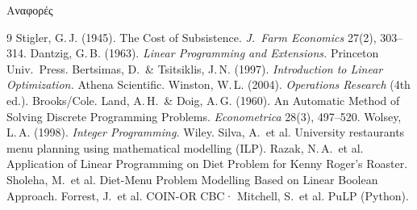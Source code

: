 \documentclass[aspectratio=169,11pt]{beamer}
\newcommand{\en}[1]{\textenglish{#1}}
\begin{document}
\appendix
\begin{frame}[allowframebreaks]{Αναφορές}
  \footnotesize
  \begin{thebibliography}{9}
     \en{Stigler, G.\,J. (1945). The Cost of Subsistence.
      \textit{J.\ Farm Economics} 27(2), 303--314.}
     \en{Dantzig, G.\,B. (1963). \textit{Linear Programming and
      Extensions.} Princeton Univ.\ Press.}
     \en{Bertsimas, D.\ \& Tsitsiklis, J.\,N. (1997).
      \textit{Introduction to Linear Optimization.} Athena Scientific.}
     \en{Winston, W.\,L. (2004). \textit{Operations Research}
      (4th ed.). Brooks/Cole.}
     \en{Land, A.\,H.\ \& Doig, A.\,G. (1960). An Automatic Method
      of Solving Discrete Programming Problems. \textit{Econometrica} 28(3), 497--520.}
     \en{Wolsey, L.\,A. (1998). \textit{Integer Programming.} Wiley.}
     \en{Silva, A.\ et al. University restaurants menu planning using
      mathematical modelling (ILP).}
     \en{Razak, N.\,A.\ et al. Application of Linear Programming on
      Diet Problem for Kenny Roger's Roaster.}
     \en{Sholeha, M.\ et al. Diet-Menu Problem Modelling Based on
      Linear Boolean Approach.}
     \en{Forrest, J.\ et al. COIN-OR CBC· Mitchell, S.\ et al.
      PuLP (Python).}
  \end{thebibliography}
\end{frame}
\end{document}
